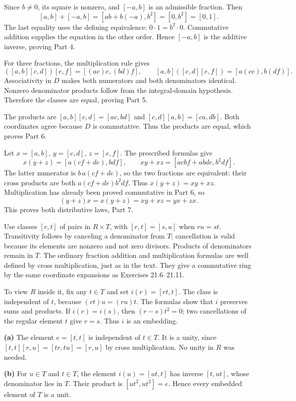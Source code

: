 Since $b\ne0$, its square is nonzero, and $[-a,b]$ is an admissible fraction. Then
\[[a,b]+[-a,b]=[ab+b(-a),b^2]=[0,b^2]=[0,1].
\]
The last equality uses the defining equivalence: $0\cdot1=b^2\cdot0$. Commutative addition supplies the equation in the other order. Hence $[-a,b]$ is the additive inverse, proving Part 4.

For three fractions, the multiplication rule gives
\[([a,b][c,d])[e,f]=[(ac)e,(bd)f],\qquad
[a,b]([c,d][e,f])=[a(ce),b(df)].
\]
Associativity in $D$ makes both numerators and both denominators identical. Nonzero denominator products follow from the integral-domain hypothesis. Therefore the classes are equal, proving Part 5.

The products are $[a,b][c,d]=[ac,bd]$ and $[c,d][a,b]=[ca,db]$. Both coordinates agree because $D$ is commutative. Thus the products are equal, which proves Part 6.

Let $x=[a,b]$, $y=[c,d]$, $z=[e,f]$. The prescribed formulas give
\[x(y+z)=[a(cf+de),bdf],\qquad xy+xz=[acbf+abde,b^2df].
\]
The latter numerator is $b\,a(cf+de)$, so the two fractions are equivalent: their cross products are both $a(cf+de)b^2df$. Thus $x(y+z)=xy+xz$. Multiplication has already been proved commutative in Part 6, so
\[(y+z)x=x(y+z)=xy+xz=yx+zx.
\]
This proves both distributive laws, Part 7.

Use classes $[r,t]$ of pairs in $R\times T$, with $[r,t]=[s,u]$ when $ru=st$. Transitivity follows by canceling a denominator from $T$; cancellation is valid because its elements are nonzero and not zero divisors. Products of denominators remain in $T$. The ordinary fraction addition and multiplication formulas are well defined by cross multiplication, just as in the text. They give a commutative ring by the same coordinate expansions as Exercises 21.6--21.11.\par
To view $R$ inside it, fix any $t\in T$ and set $i(r)=[rt,t]$. The class is independent of $t$, because $(rt)u=(ru)t$. The formulas show that $i$ preserves sums and products. If $i(r)=i(s)$, then $(r-s)t^2=0$; two cancellations of the regular element $t$ give $r=s$. Thus $i$ is an embedding.\par
\textbf{(a)} The element $e=[t,t]$ is independent of $t\in T$. It is a unity, since $[t,t][r,u]=[tr,tu]=[r,u]$ by cross multiplication. No unity in $R$ was needed.\par
\textbf{(b)} For $u\in T$ and $t\in T$, the element $i(u)=[ut,t]$ has inverse $[t,ut]$, whose denominator lies in $T$. Their product is $[ut^2,ut^2]=e$. Hence every embedded element of $T$ is a unit.

